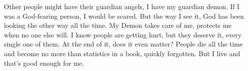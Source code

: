 \documentclass[11pt,letterpaper]{article}
\begin{document}
Other people might have their guardian angels, I have my guardian demon. If I was a God-fearing person, I would be scared. But the way I see it, God has been looking the other way all the time. My Demon takes care of me, protects me when no one else will. I know people are getting hurt, but they deserve it, every single one of them. At the end of it, does it even matter? People die all the time and become no more than statistics in a book, quickly forgotten. But I live and that's good enough for me.
\end{document}
